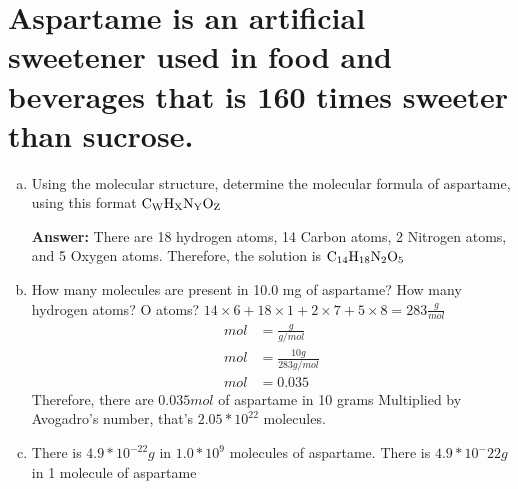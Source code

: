 \documentclass[11pt]{article}
\begin{document}
\section{Aspartame is an artificial sweetener used in food and beverages that is 160 times sweeter than sucrose.}
\label{sec:orgd52d7d1}
\begin{enumerate}[(a)]
\item Using the molecular structure, determine the molecular formula of aspartame,
using this format \(\ce{C_{W}H_{X}N_{Y}O_{Z}}\)

\textbf{Answer:} There are 18 hydrogen atoms, 14 Carbon atoms, 2 Nitrogen atoms, and 5 Oxygen atoms. Therefore, the solution is \(\ce{C14H18N2O5}\)
\item How many molecules are present in 10.0 mg of aspartame? How many hydrogen atoms? O atoms?
\(14\times6+18\times1+2\times7+5\times8=283\frac{g}{mol}\)
\begin{align*}
mol&=\frac{g}{g/mol}\\
mol&=\frac{10g}{283g/mol}\\
mol&=0.035
\end{align*}
Therefore, there are \(0.035mol\) of aspartame in 10 grams
Multiplied by Avogadro's number, that's \(2.05*10^{22}\) molecules.

\item There is \(4.9*10^{-22}g\) in \(1.0*10^{9}\) molecules of aspartame. There
is \(4.9*10^-22g\) in 1 molecule of aspartame
\end{enumerate}
\end{document}
